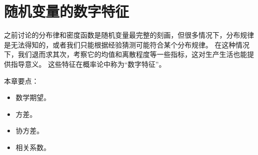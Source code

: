 \chapter{随机变量的数字特征}

之前讨论的分布律和密度函数是随机变量最完整的刻画，但很多情况下，分布规律是无法得知的，或者我们只能根据经验猜测可能符合某个分布规律。
在这种情况下，我们退而求其次，考察它的均值和离散程度等一些指标，这对生产生活也能提供指导意义。
这些特征在概率论中称为“数字特征”。

本章要点：
\begin{itemize}
    \item 数学期望。
    \item 方差。
    \item 协方差。
    \item 相关系数。
\end{itemize}

\newpage


\newpage


\newpage


\newpage


\newpage


\newpage





